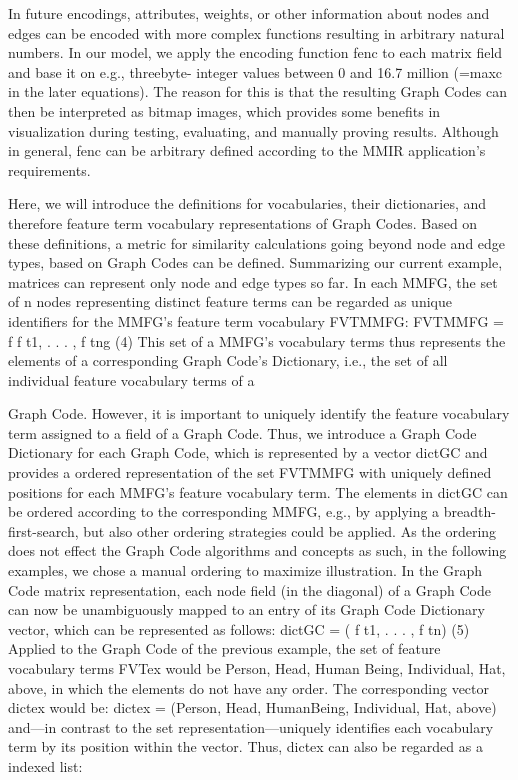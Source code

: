 In future encodings, attributes, weights, or other information about nodes and edges
can be encoded with more complex functions resulting in arbitrary natural numbers. In our
model, we apply the encoding function fenc to each matrix field and base it on e.g., threebyte-
integer values between 0 and 16.7 million (=maxc in the later equations). The reason
for this is that the resulting Graph Codes can then be interpreted as bitmap images,
which provides some benefits in visualization during testing, evaluating, and manually
proving results. Although in general, fenc can be arbitrary defined according to the MMIR
application’s requirements.

Here, we will introduce the definitions for vocabularies, their dictionaries, and therefore
feature term vocabulary representations of Graph Codes. Based on these definitions,
a metric for similarity calculations going beyond node and edge types, based on Graph
Codes can be defined. Summarizing our current example, matrices can represent only node
and edge types so far. In each MMFG, the set of n nodes representing distinct feature terms
can be regarded as unique identifiers for the MMFG’s feature term vocabulary FVTMMFG:
FVTMMFG = f f t1, . . . , f tng (4)
This set of a MMFG’s vocabulary terms thus represents the elements of a corresponding
Graph Code’s Dictionary, i.e., the set of all individual feature vocabulary terms of a

Graph Code. However, it is important to uniquely identify the feature vocabulary term
assigned to a field of a Graph Code. Thus, we introduce a Graph Code Dictionary for
each Graph Code, which is represented by a vector dictGC and provides a ordered representation
of the set FVTMMFG with uniquely defined positions for each MMFG’s feature
vocabulary term. The elements in dictGC can be ordered according to the corresponding
MMFG, e.g., by applying a breadth-first-search, but also other ordering strategies could be
applied. As the ordering does not effect the Graph Code algorithms and concepts as such,
in the following examples, we chose a manual ordering to maximize illustration. In the
Graph Code matrix representation, each node field (in the diagonal) of a Graph Code can
now be unambiguously mapped to an entry of its Graph Code Dictionary vector, which
can be represented as follows:
dictGC = ( f t1, . . . , f tn) (5)
Applied to the Graph Code of the previous example, the set of feature vocabulary
terms FVTex would be {Person, Head, Human Being, Individual, Hat, above}, in which the
elements do not have any order. The corresponding vector dictex would be:
dictex = (Person, Head, HumanBeing,
Individual, Hat, above)
and—in contrast to the set representation—uniquely identifies each vocabulary term by its
position within the vector. Thus, dictex can also be regarded as a indexed list:

